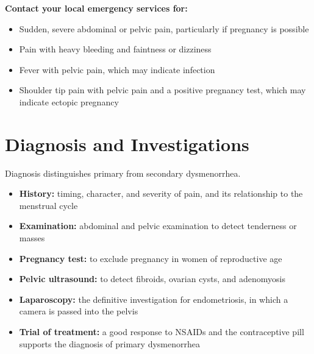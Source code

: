 \textbf{Contact your local emergency services for:}
\begin{itemize}
    \item Sudden, severe abdominal or pelvic pain, particularly if pregnancy is possible
    \item Pain with heavy bleeding and faintness or dizziness
    \item Fever with pelvic pain, which may indicate infection
    \item Shoulder tip pain with pelvic pain and a positive pregnancy test, which may indicate ectopic pregnancy
\end{itemize}

\section*{Diagnosis and Investigations}
Diagnosis distinguishes primary from secondary dysmenorrhea.
\begin{itemize}
    \item \textbf{History:} timing, character, and severity of pain, and its relationship to the menstrual cycle
    \item \textbf{Examination:} abdominal and pelvic examination to detect tenderness or masses
    \item \textbf{Pregnancy test:} to exclude pregnancy in women of reproductive age
    \item \textbf{Pelvic ultrasound:} to detect fibroids, ovarian cysts, and adenomyosis
    \item \textbf{Laparoscopy:} the definitive investigation for endometriosis, in which a camera is passed into the pelvis
    \item \textbf{Trial of treatment:} a good response to NSAIDs and the contraceptive pill supports the diagnosis of primary dysmenorrhea
\end{itemize}

